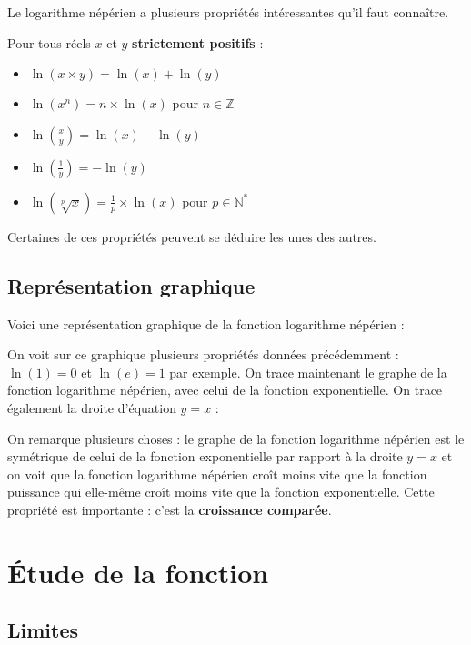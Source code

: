 	Le logarithme népérien a plusieurs propriétés intéressantes qu'il faut connaître.

	\begin{formula}[Formules]
		Pour tous réels $x$ et $y$ \textbf{strictement positifs} :
		\begin{itemize}
			\item $\ln(x \times y) = \ln(x) + \ln(y)$
			\item $\ln(x^n) = n \times \ln(x)$ pour $n \in \mathbb{Z}$
			\item $\ln\left(\frac{x}{y}\right) = \ln(x) - \ln(y)$
			\item $\ln\left(\frac{1}{y}\right) = -\ln(y)$
			\item $\ln(\sqrt[p]{x}) = \frac{1}{p} \times \ln(x)$ pour $p \in \mathbb{N}^*$
		\end{itemize}
	\end{formula}

	Certaines de ces propriétés peuvent se déduire les unes des autres.

	\subsection{Représentation graphique}
	\label{representation-graphique}

	Voici une représentation graphique de la fonction logarithme népérien :


	On voit sur ce graphique plusieurs propriétés données précédemment : $\ln(1) = 0$ et $\ln(e) = 1$ par exemple.
	On trace maintenant le graphe de la fonction logarithme népérien, avec celui de la fonction exponentielle. On trace également la droite d'équation $y = x$ :


	On remarque plusieurs choses : le graphe de la fonction logarithme népérien est le symétrique de celui de la fonction exponentielle par rapport à la
	droite $y = x$ et on voit que la fonction logarithme népérien croît moins vite que la fonction puissance qui elle-même croît moins vite que la fonction exponentielle. Cette propriété est importante : c'est la \textbf{croissance comparée}.

	\section{Étude de la fonction}

	\subsection{Limites}

